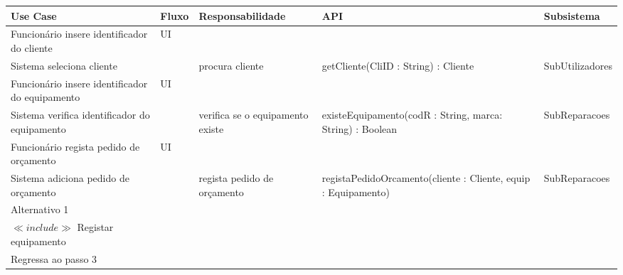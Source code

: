 \documentclass[../relatorio.tex]{subfiles}
\begin{document}
\begin{landscape}
    \begin{table}[!h]
        \centering
        \begin{tabular}{|p{5cm}|p{1cm}|p{4cm}|p{6cm}|p{3cm}|}
            \hline
            \rowcolor{gray!20!white}
            Use Case & Fluxo                                            & Responsabilidade & API & Subsistema \\
            \hline
            \rowcolor{yellow}
            Funcionário insere identificador do cliente
                     & UI
                     & 
                     & 
                     & 
            \\
            \hline
            Sistema seleciona cliente
                     & 
                     & procura cliente
                     & getCliente(CliID : String) : Cliente
                     & SubUtilizadores
            \\
            \hline
            \rowcolor{yellow}
            Funcionário insere identificador do equipamento
                     & UI
                     & 
                     & 
                     & 
            \\
            \hline
            Sistema verifica identificador do equipamento
                     & 
                     & verifica se o equipamento existe
                     & existeEquipamento(codR : String, marca: String) : Boolean
                     & SubReparacoes
            \\
            \hline
			\rowcolor{yellow}
			Funcionário regista pedido de orçamento
                     & UI
                     & 
                     & 
                     & 
            \\
            \hline
			Sistema adiciona pedido de orçamento
                     & 
                     & regista pedido de orçamento
                     & registaPedidoOrcamento(cliente : Cliente, equip : Equipamento)
                     & SubReparacoes
            \\
            \hline
            \rowcolor{red!30}
            Alternativo 1  &                                                  &                  &     &            \\
            \hline
            $\ll include \gg$ Registar equipamento
                     & 
                     & 
                     & 
                     & 
            \\
            \hline
			Regressa ao passo 3
                     & 
                     & 
                     & 
                     & 
            \\
            \hline
        \end{tabular}
    \end{table}
\end{landscape}
\end{document}
